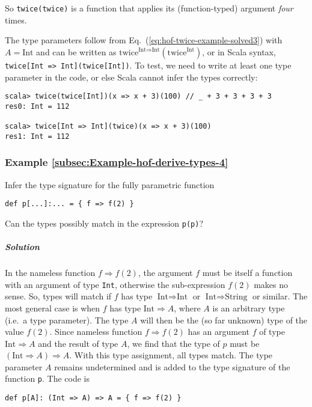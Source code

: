 So \lstinline!twice(twice)! is a function that applies its (function-typed)
argument \emph{four} times.

The type parameters follow from Eq.~(\ref{eq:hof-twice-example-solved3})
with $A=\text{Int}$ and can be written as $\text{twice}^{\text{Int}\Rightarrow\text{Int}}(\text{twice}^{\text{Int}})$,
or in Scala syntax, \lstinline!twice[Int => Int](twice[Int])!. To
test, we need to write at least one type parameter in the code, or
else Scala cannot infer the types correctly:
\begin{lstlisting}
scala> twice(twice[Int])(x => x + 3)(100) // _ + 3 + 3 + 3 + 3
res0: Int = 112

scala> twice[Int => Int](twice)(x => x + 3)(100)
res1: Int = 112
\end{lstlisting}


\subsubsection{Example \label{subsec:Example-hof-derive-types-4}\ref{subsec:Example-hof-derive-types-4}}

Infer the type signature for the fully parametric function
\begin{lstlisting}
def p[...]:... = { f => f(2) }
\end{lstlisting}
Can the types possibly match in the expression \lstinline!p(p)!?

\subparagraph{Solution}

In the nameless function $f\Rightarrow f(2)$, the argument $f$ must
be itself a function with an argument of type \lstinline!Int!, otherwise
the sub-expression $f(2)$ makes no sense. So, types will match if
$f$ has type $\text{Int}\Rightarrow\text{Int}$ or $\text{Int}\Rightarrow\text{String}$
or similar. The most general case is when $f$ has type $\text{Int}\Rightarrow A$,
where $A$ is an arbitrary type (i.e.~a type parameter). The type
$A$ will then be the (so far unknown) type of the value $f(2)$.
Since nameless function $f\Rightarrow f(2)$ has an argument $f$
of type $\text{Int}\Rightarrow A$ and the result of type $A$, we
find that the type of $p$ must be $\left(\text{Int}\Rightarrow A\right)\Rightarrow A$.
With this type assignment, all types match. The type parameter $A$
remains undetermined and is added to the type signature of the function
\lstinline!p!. The code is
\begin{lstlisting}
def p[A]: (Int => A) => A = { f => f(2) }
\end{lstlisting}

